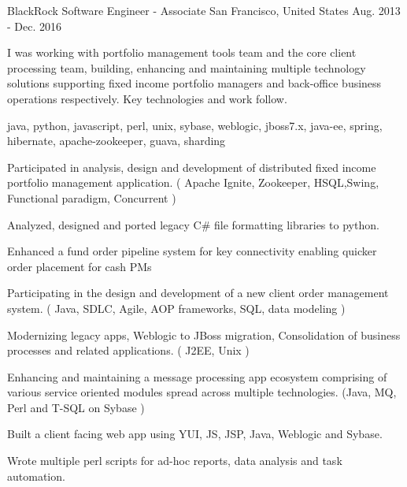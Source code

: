 \cventry
    {BlackRock} %
    {Software Engineer - Associate} %
    {San Francisco, United States} %
    {Aug. 2013 - Dec. 2016} %
    {
    \begin{cvitems} %
        I was working with portfolio management tools team and the core client processing team, building, enhancing and maintaining multiple technology solutions
    supporting fixed income portfolio managers and back-office business operations respectively. Key technologies and work follow.
        \item { java, python, javascript, perl, unix, sybase, weblogic, jboss7.x, java-ee, spring, hibernate, apache-zookeeper, guava, sharding}
        \item { Participated in analysis, design and development of distributed fixed income portfolio management application. ( Apache Ignite, Zookeeper, HSQL,Swing, Functional paradigm, Concurrent )}
        \item { Analyzed, designed and ported legacy C\# file formatting libraries to python.}
        \item { Enhanced a fund order pipeline system for key connectivity enabling quicker order placement for cash PMs}
        \item { Participating in the design and development of a new client order management system. ( Java, SDLC, Agile, AOP frameworks, SQL, data modeling )}
        \item { Modernizing legacy apps, Weblogic to JBoss migration, Consolidation of business processes and related applications. ( J2EE, Unix )}
        \item { Enhancing and maintaining a message processing app ecosystem comprising of various service oriented modules spread across multiple technologies. (Java, MQ, Perl and T-SQL on Sybase )}
        \item { Built a client facing web app using YUI, JS, JSP, Java, Weblogic and Sybase.}
        \item { Wrote multiple perl scripts for ad-hoc reports, data analysis and task automation.}
    \end{cvitems}
    }